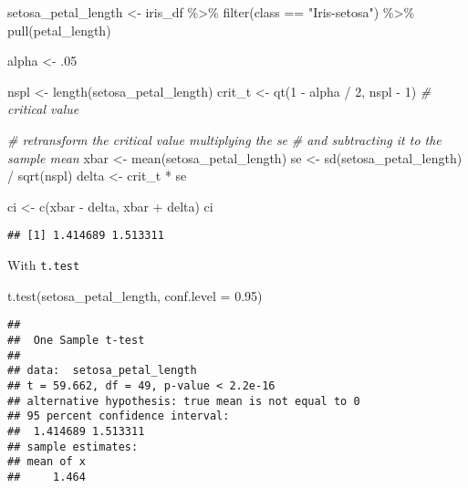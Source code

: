 \documentclass[
  oneside]{book}
\newenvironment{Shaded}{\begin{snugshade}}{\end{snugshade}}
\newcommand{\AttributeTok}[1]{\textcolor[rgb]{0.77,0.63,0.00}{#1}}
\newcommand{\CommentTok}[1]{\textcolor[rgb]{0.56,0.35,0.01}{\textit{#1}}}
\newcommand{\DecValTok}[1]{\textcolor[rgb]{0.00,0.00,0.81}{#1}}
\newcommand{\FloatTok}[1]{\textcolor[rgb]{0.00,0.00,0.81}{#1}}
\newcommand{\FunctionTok}[1]{\textcolor[rgb]{0.00,0.00,0.00}{#1}}
\newcommand{\NormalTok}[1]{#1}
\newcommand{\OtherTok}[1]{\textcolor[rgb]{0.56,0.35,0.01}{#1}}
\newcommand{\SpecialCharTok}[1]{\textcolor[rgb]{0.00,0.00,0.00}{#1}}
\newcommand{\StringTok}[1]{\textcolor[rgb]{0.31,0.60,0.02}{#1}}
\begin{document}
\begin{Shaded}
\begin{Highlighting}[]
\NormalTok{setosa\_petal\_length }\OtherTok{\textless{}{-}}\NormalTok{ iris\_df }\SpecialCharTok{\%\textgreater{}\%}
  \FunctionTok{filter}\NormalTok{(class }\SpecialCharTok{==} \StringTok{"Iris{-}setosa"}\NormalTok{) }\SpecialCharTok{\%\textgreater{}\%}
  \FunctionTok{pull}\NormalTok{(petal\_length)}

\NormalTok{alpha }\OtherTok{\textless{}{-}}\NormalTok{ .}\DecValTok{05}

\NormalTok{nspl }\OtherTok{\textless{}{-}} \FunctionTok{length}\NormalTok{(setosa\_petal\_length)}
\NormalTok{crit\_t }\OtherTok{\textless{}{-}} \FunctionTok{qt}\NormalTok{(}\DecValTok{1} \SpecialCharTok{{-}}\NormalTok{ alpha }\SpecialCharTok{/} \DecValTok{2}\NormalTok{, nspl }\SpecialCharTok{{-}} \DecValTok{1}\NormalTok{) }\CommentTok{\# critical value}

\CommentTok{\# retransform the critical value multiplying the se}
\CommentTok{\# and subtracting it to the sample mean}
\NormalTok{xbar }\OtherTok{\textless{}{-}} \FunctionTok{mean}\NormalTok{(setosa\_petal\_length)}
\NormalTok{se }\OtherTok{\textless{}{-}} \FunctionTok{sd}\NormalTok{(setosa\_petal\_length) }\SpecialCharTok{/} \FunctionTok{sqrt}\NormalTok{(nspl)}
\NormalTok{delta }\OtherTok{\textless{}{-}}\NormalTok{ crit\_t }\SpecialCharTok{*}\NormalTok{ se}

\NormalTok{ci }\OtherTok{\textless{}{-}} \FunctionTok{c}\NormalTok{(xbar }\SpecialCharTok{{-}}\NormalTok{ delta, xbar }\SpecialCharTok{+}\NormalTok{ delta)}
\NormalTok{ci}
\end{Highlighting}
\end{Shaded}

\begin{verbatim}
## [1] 1.414689 1.513311
\end{verbatim}

With \texttt{t.test}

\begin{Shaded}
\begin{Highlighting}[]
\FunctionTok{t.test}\NormalTok{(setosa\_petal\_length, }\AttributeTok{conf.level =} \FloatTok{0.95}\NormalTok{)}
\end{Highlighting}
\end{Shaded}

\begin{verbatim}
## 
##  One Sample t-test
## 
## data:  setosa_petal_length
## t = 59.662, df = 49, p-value < 2.2e-16
## alternative hypothesis: true mean is not equal to 0
## 95 percent confidence interval:
##  1.414689 1.513311
## sample estimates:
## mean of x 
##     1.464
\end{verbatim}
\end{document}
